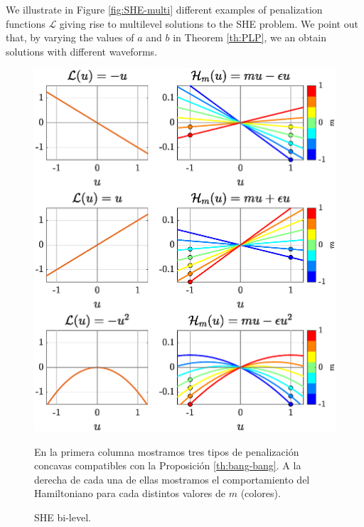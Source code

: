 \documentclass[twocolumn]{autart}    %
\begin{document}
We illustrate in Figure \ref{fig:SHE-multi} different examples of penalization functions $\mathcal{L}$ giving rise to multilevel solutions to the SHE problem.
We point out that, by varying the values of $a$ and $b$ in Theorem \ref{th:PLP}, we an obtain solutions with different waveforms.


\begin{figure} 
    \centering
    \includegraphics[scale=0.415]{img/fig03.eps}
    \caption{SHE bi-level.} \footnotesize En la primera columna mostramos tres tipos de penalización concavas compatibles con la Proposición \ref{th:bang-bang}. A la derecha de cada una de ellas mostramos el comportamiento del Hamiltoniano para cada distintos valores de $m$ (colores). 
    \footnotesize

    \label{fig:Bang-Bang-penalization}
\end{figure}
\end{document}
